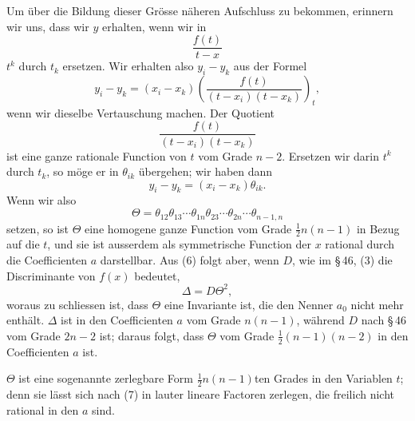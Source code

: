 \documentclass[11pt]{article}
\begin{document}
Um über die Bildung dieser Grösse näheren Aufschluss zu bekommen, erinnern wir uns, dass wir $y$ erhalten, wenn wir in
\[
 \frac{f(t)}{t-x}
\]
$t^k$ durch $t_k$ ersetzen. Wir erhalten also $y_i-y_k$ aus der Formel
\begin{equation}
 y_i-y_k=(x_i-x_k)\left(\frac{f(t)}{(t-x_i)(t-x_k)}\right)_t,
\tag{5}
\end{equation}
wenn wir dieselbe Vertauschung machen. Der Quotient
\[
 \frac{f(t)}{(t-x_i)(t-x_k)}
\]
ist eine ganze rationale Function von $t$ vom Grade $n-2$. Ersetzen wir darin $t^k$ durch $t_k$, so möge er in $\theta_{ik}$ übergehen; wir haben dann
\begin{equation}
 y_i-y_k=(x_i-x_k)\theta_{ik}.
\tag{6}
\end{equation}
Wenn wir also
\begin{equation}
 \Theta=\theta_{12}\theta_{13}\cdots\theta_{1n}\theta_{23}\cdots\theta_{2n}\cdots\theta_{n-1,n}
\tag{7}
\end{equation}
setzen, so ist $\Theta$ eine homogene ganze Function vom Grade $\frac12n(n-1)$ in Bezug auf die $t$, und sie ist ausserdem als symmetrische Function der $x$ rational durch die Coefficienten $a$ darstellbar. Aus (6) folgt aber, wenn $D$, wie im \S\,46, (3) die Discriminante von $f(x)$ bedeutet,
\begin{equation}
 \Delta=D\Theta^2,
\tag{8}
\end{equation}
woraus zu schliessen ist, dass $\Theta$ eine Invariante ist, die den Nenner $a_0$ nicht mehr enthält. $\Delta$ ist in den Coefficienten $a$ vom Grade $n(n-1)$, während $D$ nach \S\,46 vom Grade $2n-2$ ist; daraus folgt, dass $\Theta$ vom Grade $\frac12(n-1)(n-2)$ in den Coefficienten $a$ ist.

$\Theta$ ist eine sogenannte zerlegbare Form $\frac12n(n-1)$ten Grades in den Variablen $t$; denn sie lässt sich nach (7) in lauter lineare Factoren zerlegen, die freilich nicht rational in den $a$ sind.
\end{document}
